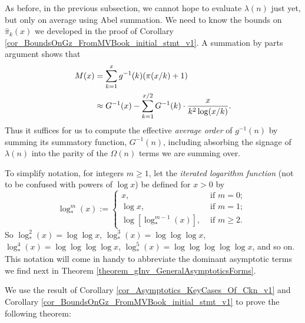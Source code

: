 \documentclass[11pt,reqno,a4letter]{article}
\numberwithin{figure}{section}
\numberwithin{table}{section}
\theoremstyle{plain}
\numberwithin{theorem}{section}
\theoremstyle{definition}
\begin{document}
As before, in the previous subsection, we cannot hope to evaluate $\lambda(n)$ just yet, but only on 
average using Abel summation. We need to know the bounds on $\widehat{\pi}_k(x)$ we developed in the 
proof of Corollary \ref{cor_BoundsOnGz_FromMVBook_initial_stmt_v1}. 
A summation by parts argument shows that 
\begin{align} 
\notag
M(x) & = \sum_{k=1}^{x} g^{-1}(k) (\pi(x/k)+1) \\ 
\label{eqn_pf_tag_v2-restated_v2} 
     & \approx G^{-1}(x) - \sum_{k=1}^{x/2} G^{-1}(k) \cdot \frac{x}{k^2 \log(x/k)}. 
\end{align} 
Thus it suffices for us to compute the effective \emph{average order} of $g^{-1}(n)$ 
by summing its summatory function, $G^{-1}(n)$, including absorbing the signage of 
$\lambda(n)$ into the parity of the $\Omega(n)$ terms we are summing over. 

To simplify notation, for integers $m \geq 1$, let the \emph{iterated logarithm function} 
(not to be confused with powers of $\log x$) be defined for $x > 0$ by 
\[
\log_{\ast}^{m}(x) := \begin{cases} 
     x, & \text{ if $m = 0$; } \\ 
     \log x, & \text{ if $m = 1$; } \\ 
     \log\left[\log_{\ast}^{m-1}(x)\right], & \text{ if $m \geq 2$. } 
     \end{cases}
\]
So $\log_{\ast}^2(x) = \log\log x$, $\log_{\ast}^3(x) = \log\log\log x$, 
$\log_{\ast}^4(x) = \log\log\log\log x$, $\log_{\ast}^5(x) = \log\log\log\log\log x$, and so on. 
This notation will come in handy to abbreviate the dominant asymptotic terms we find next in 
Theorem \ref{theorem_gInv_GeneralAsymptoticsForms}. 

We use the result of 
Corollary \ref{cor_Asymptotics_KeyCases_Of_Ckn_v1} and 
Corollary \ref{cor_BoundsOnGz_FromMVBook_initial_stmt_v1} 
to prove the following theorem: 
\end{document}
